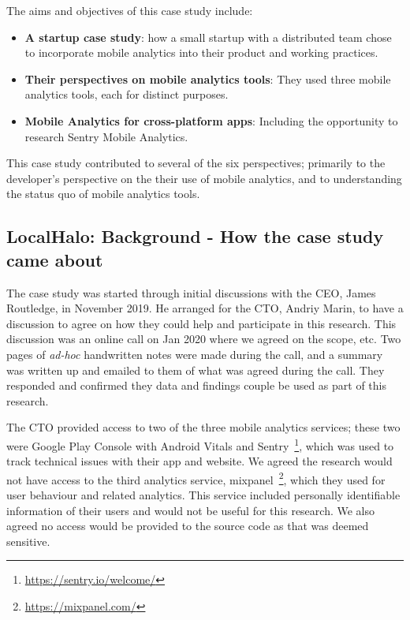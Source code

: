 The aims and objectives of this case study include:
\begin{itemize}
    \item \textbf{A startup case study}: how a small startup with a distributed team chose to incorporate mobile analytics into their product and working practices.
    \item \textbf{Their perspectives on mobile analytics tools}: They used three mobile analytics tools, each for distinct purposes. 
    \item \textbf{Mobile Analytics for cross-platform apps}: Including the opportunity to research Sentry Mobile Analytics. 
\end{itemize}

This case study contributed to several of the six perspectives; primarily to the developer's perspective on the their use of mobile analytics, and to understanding the status quo of mobile analytics tools.



\subsection{LocalHalo: Background - How the case study came about}
The case study was started through initial discussions with the CEO, James Routledge, in November 2019. He arranged for the CTO, Andriy Marin, to have a discussion to agree on how they could help and participate in this research. This discussion was an online call on  Jan 2020 where we agreed on the scope, etc. Two pages of \emph{ad-hoc} handwritten notes were made during the call, and a summary was written up and emailed to them of what was agreed during the call. They responded and confirmed they data and findings couple be used as part of this research.

The CTO provided access to two of the three mobile analytics services; these two were Google Play Console with Android Vitals and Sentry~\footnote{\url{https://sentry.io/welcome/}}, which was used to track technical issues with their app and website. We agreed the research would not have access to the third analytics service, mixpanel~\footnote{\url{https://mixpanel.com/}}, which they used for user behaviour and related analytics. This service included personally identifiable information of their users and would not be useful for this research. We also agreed no access would be provided to the source code as that was deemed sensitive. 

